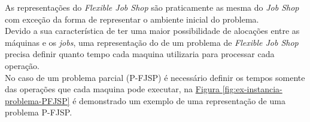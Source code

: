 As representações do \textit{Flexible Job Shop} são praticamente as mesma do \textit{Job Shop} com exceção da forma de representar o ambiente inicial do problema. \\
Devido a sua característica de ter uma maior possibilidade de alocações entre as máquinas e os \textit{jobs}, 
%
uma representação do de um problema de \textit{Flexible Job Shop} precisa definir quanto tempo cada maquina utilizaria para processar cada operação.\\
%
No caso de um problema parcial (P-FJSP) é necessário definir os tempos somente das operações que cada maquina pode executar, na 
\hyperref[fig:ex-instancia-problema-PFJSP]{Figura \ref{fig:ex-instancia-problema-PFJSP}}
é demonstrado um exemplo de uma representação de uma problema P-FJSP.
